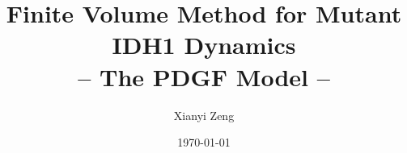 \documentclass{amsart}
\theoremstyle{definition}
\theoremstyle{remark}
\numberwithin{equation}{section}
\numberwithin{figure}{section}
\begin{document}
\title[Numerical IDH1 Dynamics]{Finite Volume Method for Mutant IDH1 Dynamics\\ -- The PDGF Model --}
\author[X.~Zeng]{Xianyi Zeng}
\address{Department of Mathematical Sciences, University of Texas at El Paso, El Paso TX 79902, United States.\\
         Tel.: +1-915-747-6759}
\date{\today}




\maketitle
\end{document}
